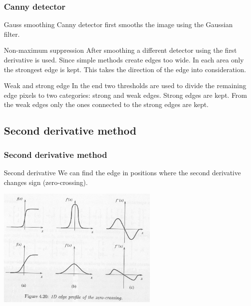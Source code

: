 \documentclass{beamer}
\begin{document}
\begin{frame}
\frametitle{Canny detector}
  \begin{block}{Gauss smoothing}
  Canny detector first smooths the image using the Gaussian filter.
  \end{block}    
  
  \begin{block}{Non-maximum suppression}
  After smoothing a different detector using the first derivative is used. Since simple methods create edges too wide. In each area only the strongest edge is kept. This takes the direction of the edge into consideration.
  \end{block}  
  
  \begin{block}{Weak and strong edge}
  In the end two thresholds are used to divide the remaining edge pixels to two categories: strong and weak edges. Strong edges are kept. From the weak edges only the ones connected to the strong edges are kept.
  \end{block}
\end{frame}

\subsection{Second derivative method}

\begin{frame}
\frametitle{Second derivative method}
  \begin{block}{Second derivative}
  We can find the edge in positions where the second derivative changes sign (zero-crossing).
  \end{block}
    
  \begin{center}
  \includegraphics[width=0.6\textwidth]{zero-crossing.png}
  \end{center}
\end{frame}
\end{document}
